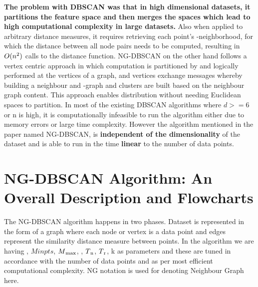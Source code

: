 \documentclass[acmsmall]{acmart}
\begin{document}
\textbf{The problem with DBSCAN was that in high dimensional datasets, it partitions the feature space and then merges the spaces which lead to high computational complexity in large datasets.} Also when applied to arbitrary distance measures, it requires retrieving each point’s \textepsilon-neighborhood, for which the distance between all node pairs needs to be computed, resulting in $O(n\textsuperscript{2})$ calls to the distance function. 
NG-DBSCAN on the other hand follows a vertex centric approach in which computation is partitioned by and logically performed at the vertices of a graph, and vertices exchange messages whereby building a neighbour and \textepsilon-graph and clusters are built based on the neighbour graph content. This approach enables distribution without needing Euclidean spaces to partition.
In most of the existing DBSCAN algorithms where $d >= 6$ or n is high, it is computationally infeasible to run the algorithm either due to memory errors or large time complexity. However the algorithm mentioned in the paper named NG-DBSCAN, is \textbf{independent of the dimensionality} of the dataset and is able to run in the time \textbf{linear} to the number of data points.  


\section* {NG-DBSCAN Algorithm: An Overall Description and Flowcharts }
The NG-DBSCAN algorithm happens in two phases. Dataset is represented in the form of a graph where each node or vertex is a data point and edges represent the similarity distance measure between points. In the algorithm we are having \textepsilon, $Minpts$, $M\textsubscript{max}$, \textrho, $T\textsubscript{n}$, $T\textsubscript{r}$, k as parameters and these are tuned in accordance with the number of data points and as per most efficient computational complexity. NG notation is used for denoting Neighbour Graph here.
\end{document}
